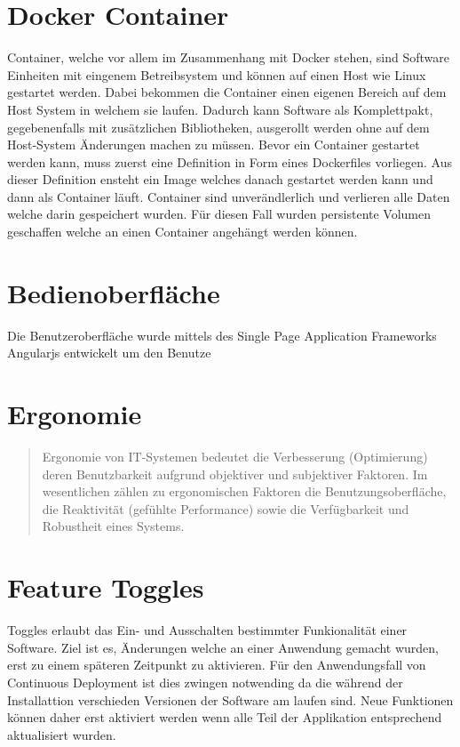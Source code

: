 \section{Docker Container}
\label{container}
Container, welche vor allem im Zusammenhang mit Docker stehen, sind Software Einheiten mit eingenem Betreibsystem und können auf einen Host wie Linux gestartet werden. Dabei bekommen die Container einen eigenen Bereich auf dem Host System in welchem sie laufen. Dadurch kann Software als Komplettpakt, gegebenenfalls mit zusätzlichen Bibliotheken, ausgerollt werden ohne auf dem Host-System Änderungen machen zu müssen. \newline
Bevor ein Container gestartet werden kann, muss zuerst eine Definition in Form eines Dockerfiles vorliegen. Aus dieser Definition ensteht ein Image welches danach gestartet werden kann und dann als Container läuft. Container sind unverändlerlich und verlieren alle Daten welche darin gespeichert wurden. Für diesen Fall wurden persistente Volumen geschaffen welche an einen Container angehängt werden können.

\section{Bedienoberfläche}

Die Benutzeroberfläche wurde mittels des Single Page Application Frameworks Angularjs entwickelt um den Benutze

\section{Ergonomie}

\begin{quote}
	Ergonomie von IT-Systemen bedeutet die Verbesserung (Optimierung) deren Benutzbarkeit aufgrund objektiver und subjektiver Faktoren. Im wesentlichen zählen zu ergonomischen Faktoren die Benutzungsoberfläche, die Reaktivität (gefühlte Performance) sowie die Verfügbarkeit und Robustheit eines Systems.
\end{quote}

\section{Feature Toggles}

Toggles erlaubt das Ein- und Ausschalten bestimmter Funkionalität einer Software. Ziel ist es, Änderungen welche an einer Anwendung gemacht wurden, erst zu einem späteren Zeitpunkt zu aktivieren. Für den Anwendungsfall von Continuous Deployment ist dies zwingen notwending da die während der Installattion verschieden Versionen der Software am laufen sind. Neue Funktionen können daher erst aktiviert werden wenn alle Teil der Applikation entsprechend aktualisiert wurden.

